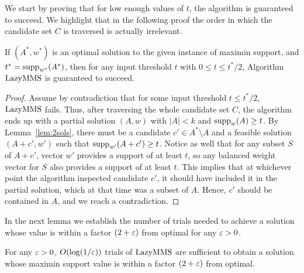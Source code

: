 We start by proving that for low enough values of $t$, the algorithm is guaranteed to succeed. 
We highlight that in the following proof the order in which the candidate set $C$ is traversed is actually irrelevant. 

\begin{lemma}\label{lem:success}
If $(A^*, w^*)$ is an optimal solution to the given instance of maximin support, and $t^*=\operatorname{supp}_{w^*}(A^*)$, then for any input threshold $t$ with $0\leq t\leq t^*/2$, Algorithm $\operatorname{LazyMMS}$ is guaranteed to succeed.
\end{lemma}

\begin{proof}
Assume by contradiction that for some input threshold $t\leq t^*/2$, $\operatorname{LazyMMS}$ fails. Thus, after traversing the whole candidate set $C$, the algorithm ends up with a partial solution $(A,w)$ with $|A|<k$ and $\operatorname{supp}_w(A)\geq t$. By Lemma~\ref{lem:2sols}, there must be a candidate $c'\in A^*\setminus A$ and a feasible solution $(A+c', w')$ such that $\operatorname{supp}_{w'}(A+c')\geq t$. Notice as well that for any subset $S$ of $A+c'$, vector $w'$ provides a support of at least $t$, so any balanced weight vector for $S$ also provides a support of at least $t$. This implies that at whichever point the algorithm inspected candidate $c'$, it should have included it in the partial solution, which at that time was a subset of $A$. Hence, $c'$ should be contained in $A$, and we reach a contradiction.
\end{proof}

In the next lemma we establish the number of trials needed to achieve a solution whose value is within a factor $(2+\varepsilon)$ from optimal for any $\varepsilon>0$. 

\begin{lemma}\label{lem:lazybinary}
For any $\varepsilon>0$, $O(\log(1/\varepsilon))$ trials of $\operatorname{LazyMMS}$ are sufficient to obtain a solution whose maximin support value is within a factor $(2+\varepsilon)$ from optimal.
\end{lemma}

